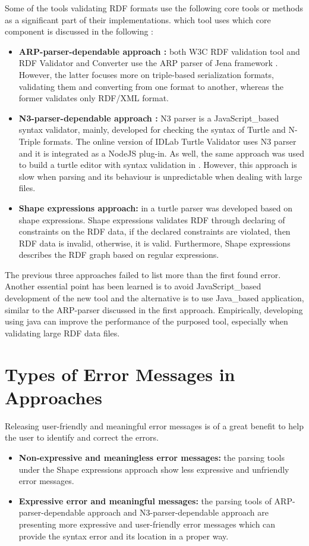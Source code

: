 Some of the tools validating RDF formats use the following core tools or methods as a significant part of their implementations. which tool  uses which core component is discussed in the following : \begin{itemize}[noitemsep] 
	\item \textbf{ARP-parser-dependable approach :} both W3C RDF validation tool \cite{W3C:Validation:Online} and RDF Validator and Converter \cite{Mybluemix:Validation:Online} use the ARP parser of Jena framework \cite{McBride:2002:JSW:613357.613755}. However, the latter focuses more on triple-based serialization formats, validating them and converting from one format to another, whereas the former validates only RDF/XML format. 
	\item \textbf{N3-parser-dependable approach :} N3 parser \cite{N3Parser:Online} is a JavaScript\_based syntax validator, mainly, developed for checking the syntax of Turtle and N-Triple formats. The online version of IDLab Turtle Validator \cite{IDLab:Validation:Online} uses N3 parser and it is integrated as a NodeJS plug-in. As well, the same approach was used to build a turtle editor with syntax validation in \cite{petersenturtleeditor}. However, this approach is slow when parsing and its behaviour is unpredictable when dealing with large files. 
	\item \textbf{Shape expressions approach:} in \cite{prud2014shape} a turtle parser was developed based on shape expressions. Shape expressions validates RDF through declaring of constraints on the RDF data, if the declared constraints are violated, then RDF data is invalid, otherwise, it is valid. Furthermore, Shape expressions describes the RDF graph based on regular expressions. 
\end{itemize} 

The previous three approaches failed to list more than the first found error. Another essential point has been learned is to avoid JavaScript\_based development of the new tool and the alternative is to use Java\_based application, similar to the ARP-parser discussed in the first approach. Empirically, developing using java can improve the performance of the purposed tool, especially when  validating large RDF data files.

\section{Types of Error Messages in Approaches}
Releasing user-friendly and meaningful error messages is of a great benefit to help the user to identify and correct the errors. 
\begin{itemize}
    \item \textbf{Non-expressive and meaningless error messages:} the parsing tools under the Shape expressions approach show less expressive  and unfriendly error messages.
    \item \textbf{Expressive error and meaningful  messages:} the parsing tools of ARP-parser-dependable approach and N3-parser-dependable approach  are presenting more expressive and user-friendly error messages which can provide the syntax error and its location in a proper way. 
    
\end{itemize}

